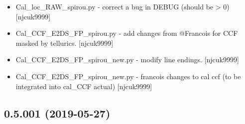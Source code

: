 \documentclass[a4paper,10pt,english]{report}
\begin{document}
\begin{itemize}
\item {} 
Cal\_loc\_RAW\_spirou.py - correct a bug in DEBUG (should be \textgreater{} 0)
{[}njcuk9999{]}

\item {} 
Cal\_CCF\_E2DS\_FP\_spirou.py - add changes from @Francois for CCF masked
by tellurics. {[}njcuk9999{]}

\item {} 
Cal\_CCF\_E2DS\_FP\_spirou\_new.py - modify line endings. {[}njcuk9999{]}

\item {} 
Cal\_CCF\_E2DS\_FP\_spirou\_new.py - francois changes to cal ccf (to be
integrated into cal\_CCF actual) {[}njcuk9999{]}

\end{itemize}


\subsection{0.5.001 (2019-05-27)}
\end{document}
